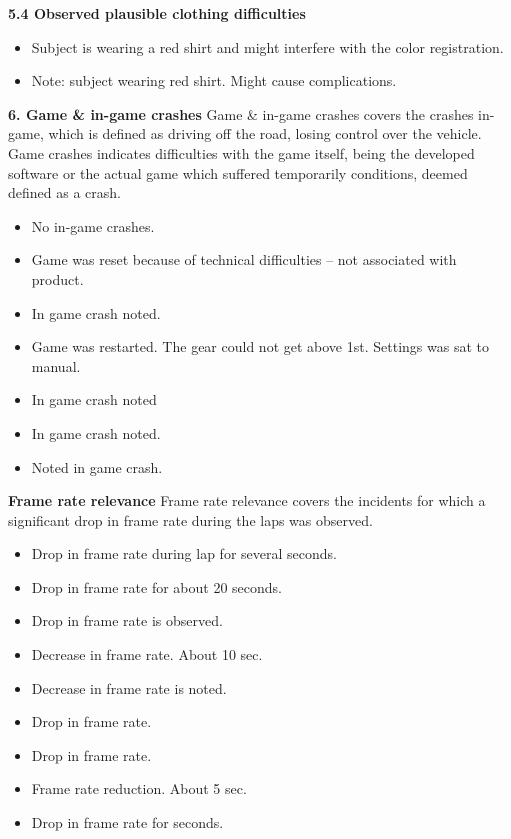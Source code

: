 \noindent\textbf{5.4 Observed plausible clothing difficulties}
\begin{itemize}
\item Subject is wearing a red shirt and might interfere with the color registration.
\item Note: subject wearing red shirt. Might cause complications.

\end{itemize}



\noindent\colorbox{NotGreen}{\textbf{6.	Game \& in-game crashes}}\newline
Game \& in-game crashes covers the crashes in-game, which is defined as driving off the road, losing control over the vehicle. Game crashes indicates difficulties with the game itself, being the developed software or the actual game which suffered temporarily conditions, deemed defined as a crash.

\begin{itemize}
\item No in-game crashes.
\item Game was reset because of technical difficulties – not associated with product.
\item In game crash noted.
\item Game was restarted. The gear could not get above 1st. Settings was sat to manual.
\item In game crash noted
\item In game crash noted.
\item Noted in game crash.

\end{itemize}



\noindent\colorbox{NotPurple}{\textbf{Frame rate relevance}}\newline
Frame rate relevance covers the incidents for which a significant drop in frame rate during the laps was observed.

\begin{itemize}
\item Drop in frame rate during lap for several seconds.
\item Drop in frame rate for about 20 seconds.
\item Drop in frame rate is observed.
\item Decrease in frame rate. About 10 sec.
\item Decrease in frame rate is noted.
\item Drop in frame rate.
\item Drop in frame rate.
\item Frame rate reduction. About 5 sec.
\item Drop in frame rate for seconds.

\end{itemize}